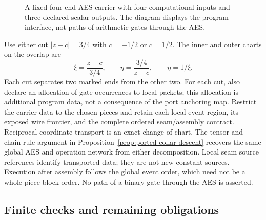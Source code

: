 \begin{figure}[ht]
\centering
{}
\caption{A fixed four-end AES carrier with four computational inputs and
three declared scalar outputs.  The diagram displays the program interface,
not paths of arithmetic gates through the AES.}
\label{fig:ported-four-inputs}
\end{figure}

Use either cut $|z-c|=3/4$ with $c=-1/2$ or $c=1/2$.  The inner and outer
charts on the overlap are
\[
  \xi=\frac{z-c}{3/4},\qquad
  \eta=\frac{3/4}{z-c},\qquad \eta=1/\xi.
\]
Each cut separates two marked ends from the other two.  For each cut, also
declare an allocation of gate occurrences to local packets; this allocation is
additional program data, not a consequence of the port anchoring map.
Restrict the carrier data to the chosen pieces and retain each local event
region, its exposed wire frontier, and the complete ordered seam/assembly
contract.
Reciprocal coordinate transport is an exact change of chart.  The tensor and
chain-rule argument in Proposition~\ref{prop:ported-collar-descent} recovers
the same global AES and operation network from either decomposition.  Local
seam source references identify transported data; they are not new constant
sources.  Execution after assembly follows the global event order, which need
not be a whole-piece block order.  No path of a binary gate through the AES
is asserted.

\subsection{Finite checks and remaining obligations}

